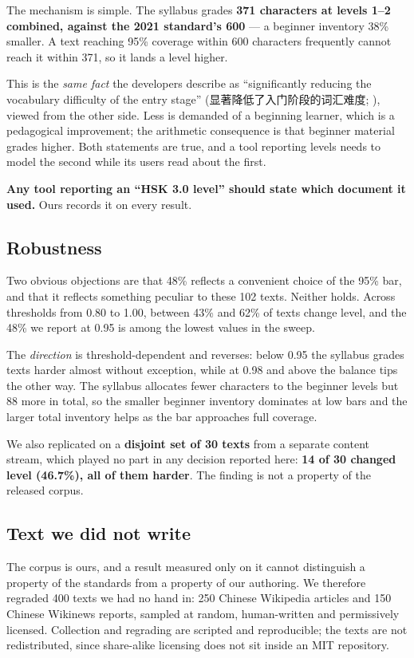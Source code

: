 \documentclass[11pt]{article}
\begin{document}
The mechanism is simple. The syllabus grades \textbf{371 characters at levels
1--2 combined, against the 2021 standard's 600} --- a beginner inventory 38\%
smaller. A text reaching 95\% coverage within 600 characters frequently cannot
reach it within 371, so it lands a level higher.

This is the \emph{same fact} the developers describe as ``significantly
reducing the vocabulary difficulty of the entry stage''
(显著降低了入门阶段的词汇难度; \citealp{feng2026hsk30}), viewed from the other
side. Less is demanded of a beginning learner, which is a pedagogical
improvement; the arithmetic consequence is that beginner material grades
higher. Both statements are true, and a tool reporting levels needs to model
the second while its users read about the first.

\textbf{Any tool reporting an ``HSK 3.0 level'' should state which document it
used.} Ours records it on every result.

\subsection{Robustness}

Two obvious objections are that 48\% reflects a convenient choice of the 95\%
bar, and that it reflects something peculiar to these 102 texts. Neither holds.
Across thresholds from 0.80 to 1.00, between 43\% and 62\% of texts change
level, and the 48\% we report at 0.95 is among the lowest values in the sweep.

The \emph{direction} is threshold-dependent and reverses: below 0.95 the
syllabus grades texts harder almost without exception, while at 0.98 and above
the balance tips the other way. The syllabus allocates fewer characters to the
beginner levels but 88 more in total, so the smaller beginner inventory
dominates at low bars and the larger total inventory helps as the bar
approaches full coverage.

We also replicated on a \textbf{disjoint set of 30 texts} from a separate
content stream, which played no part in any decision reported here:
\textbf{14 of 30 changed level (46.7\%), all of them harder}. The finding is
not a property of the released corpus.

\subsection{Text we did not write}
\label{sec:external}

The corpus is ours, and a result measured only on it cannot distinguish a
property of the standards from a property of our authoring. We therefore
regraded 400 texts we had no hand in: 250 Chinese Wikipedia articles and 150
Chinese Wikinews reports, sampled at random, human-written and permissively
licensed. Collection and regrading are scripted and reproducible; the texts are
not redistributed, since share-alike licensing does not sit inside an MIT
repository.
\end{document}
